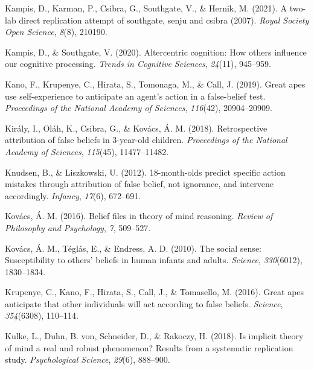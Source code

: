 \documentclass[
  english,
  man,floatsintext]{apa6}
\newlength{\cslhangindent}
\newlength{\cslentryspacingunit} %
\newenvironment{CSLReferences}[2] %
 {%
  \setlength{\parindent}{0pt}
  \ifodd #1
  \let\oldpar\par
  \def\par{\hangindent=\cslhangindent\oldpar}
  \fi
  \setlength{\parskip}{#2\cslentryspacingunit}
 }%
 {}
\begin{document}
\begin{CSLReferences}{1}{0}
\leavevmode{}%
Kampis, D., Karman, P., Csibra, G., Southgate, V., \& Hernik, M. (2021). A two-lab direct replication attempt of southgate, senju and csibra (2007). \emph{Royal Society Open Science}, \emph{8}(8), 210190.

\leavevmode{}%
Kampis, D., \& Southgate, V. (2020). Altercentric cognition: How others influence our cognitive processing. \emph{Trends in Cognitive Sciences}, \emph{24}(11), 945--959.

\leavevmode{}%
Kano, F., Krupenye, C., Hirata, S., Tomonaga, M., \& Call, J. (2019). Great apes use self-experience to anticipate an agent's action in a false-belief test. \emph{Proceedings of the National Academy of Sciences}, \emph{116}(42), 20904--20909.

\leavevmode{}%
Király, I., Oláh, K., Csibra, G., \& Kovács, Á. M. (2018). Retrospective attribution of false beliefs in 3-year-old children. \emph{Proceedings of the National Academy of Sciences}, \emph{115}(45), 11477--11482.

\leavevmode{}%
Knudsen, B., \& Liszkowski, U. (2012). 18-month-olds predict specific action mistakes through attribution of false belief, not ignorance, and intervene accordingly. \emph{Infancy}, \emph{17}(6), 672--691.

\leavevmode{}%
Kovács, Á. M. (2016). Belief files in theory of mind reasoning. \emph{Review of Philosophy and Psychology}, \emph{7}, 509--527.

\leavevmode{}%
Kovács, Á. M., Téglás, E., \& Endress, A. D. (2010). The social sense: Susceptibility to others' beliefs in human infants and adults. \emph{Science}, \emph{330}(6012), 1830--1834.

\leavevmode{}%
Krupenye, C., Kano, F., Hirata, S., Call, J., \& Tomasello, M. (2016). Great apes anticipate that other individuals will act according to false beliefs. \emph{Science}, \emph{354}(6308), 110--114.

\leavevmode{}%
Kulke, L., Duhn, B. von, Schneider, D., \& Rakoczy, H. (2018). Is implicit theory of mind a real and robust phenomenon? Results from a systematic replication study. \emph{Psychological Science}, \emph{29}(6), 888--900.


\end{CSLReferences}
\end{document}
